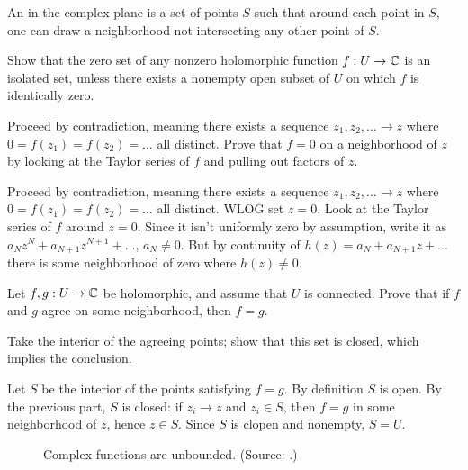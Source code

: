\begin{sproblem}
	An  in the complex plane is a
	set of points $S$ such that around each point in $S$,
	one can draw a neighborhood not intersecting any other point of $S$.

	Show that the zero set of any nonzero holomorphic
	function $f : U \to \mathbb C$ is an isolated set,
	unless there exists a nonempty open subset of $U$
	on which $f$ is identically zero.
	\begin{hint}
		Proceed by contradiction,
		meaning there exists a sequence $z_1, z_2, \dots \to z$
		where $0 = f(z_1) = f(z_2) = \dots$ all distinct.
		Prove that $f = 0$ on a neighborhood of $z$
		by looking at the Taylor series of $f$ and
		pulling out factors of $z$.
	\end{hint}
	\begin{sol}
		Proceed by contradiction, meaning there exists a sequence $z_1, z_2, \dots \to z$
		where $0 = f(z_1) = f(z_2) = \dots$ all distinct.
		WLOG set $z=0$.
		Look at the Taylor series of $f$ around $z=0$.
		Since it isn't uniformly zero by assumption,
		write it as $a_N z^N + a_{N+1}z^{N+1} + \dots$, $a_N \neq 0$.
		But by continuity of $h(z) = a_N + a_{N+1}z + \dots$ there is some
		neighborhood of zero where $h(z) \neq 0$.
	\end{sol}
\end{sproblem}

\begin{sproblem}
	\gim
	Let $f, g : U \to \mathbb C$ be holomorphic, and assume that $U$ is connected.
	Prove that if $f$ and $g$ agree on some neighborhood, then $f = g$.
	\begin{hint}
		Take the interior of the agreeing points;
		show that this set is closed, which implies the conclusion.
	\end{hint}
	\begin{sol}
		Let $S$ be the interior of the points satisfying $f=g$.
		By definition $S$ is open.
		By the previous part, $S$ is closed: if $z_i \to z$ and $z_i \in S$,
		then $f=g$ in some neighborhood of $z$, hence $z \in S$.
		Since $S$ is clopen and nonempty, $S = U$.
	\end{sol}
\end{sproblem}

\begin{figure}[ht]
	\centering
	\caption{Complex functions are unbounded. (Source: \cite{img:snsd}.)}
\end{figure}


